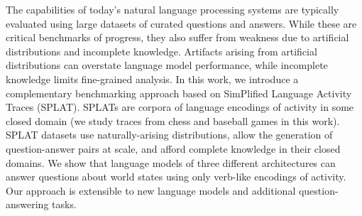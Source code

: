 The capabilities of today's natural language processing systems are typically evaluated using large datasets of curated questions and answers.  While these are critical benchmarks of progress, they also suffer from weakness due to artificial distributions and incomplete knowledge.  Artifacts arising from artificial distributions can overstate language model performance, while incomplete knowledge limits fine-grained analysis. In this work, we introduce a complementary benchmarking approach based on SimPlified Language Activity Traces (SPLAT).  SPLATs are corpora of language encodings of activity in some closed domain (we study traces from chess and baseball games in this work).  SPLAT datasets use naturally-arising distributions, allow the generation of question-answer pairs at scale, and afford complete knowledge in their closed domains.  We show that language models of three different architectures can answer questions about world states using only verb-like encodings of activity.  Our approach is extensible to new language models and additional question-answering tasks.

